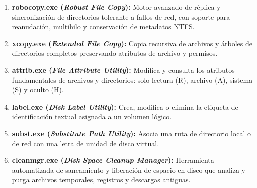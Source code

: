 \documentclass[12pt]{article}
\begin{document}
\begin{enumerate}[leftmargin=*, noitemsep, topsep=1pt]
    \item \textbf{robocopy.exe (\textit{Robust File Copy}):} Motor avanzado de réplica y sincronización de directorios tolerante a fallos de red, con soporte para reanudación, multihilo y conservación de metadatos NTFS.
    \item \textbf{xcopy.exe (\textit{Extended File Copy}):} Copia recursiva de archivos y árboles de directorios completos preservando atributos de archivo y permisos.
    \item \textbf{attrib.exe (\textit{File Attribute Utility}):} Modifica y consulta los atributos fundamentales de archivos y directorios: solo lectura (R), archivo (A), sistema (S) y oculto (H).
    \item \textbf{label.exe (\textit{Disk Label Utility}):} Crea, modifica o elimina la etiqueta de identificación textual asignada a un volumen lógico.
    \item \textbf{subst.exe (\textit{Substitute Path Utility}):} Asocia una ruta de directorio local o de red con una letra de unidad de disco virtual.
    \item \textbf{cleanmgr.exe (\textit{Disk Space Cleanup Manager}):} Herramienta automatizada de saneamiento y liberación de espacio en disco que analiza y purga archivos temporales, registros y descargas antiguas.
\end{enumerate}
\end{document}

